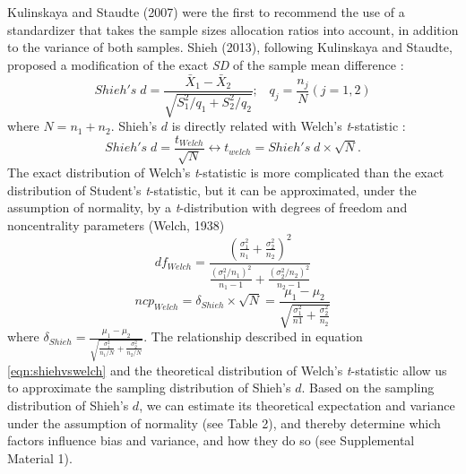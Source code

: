 \documentclass[
  english,
  man,floatsintext]{apa6}
\begin{document}
Kulinskaya and Staudte (2007) were the first to recommend the use of a standardizer that takes the sample sizes allocation ratios into account, in addition to the variance of both samples. Shieh (2013), following Kulinskaya and Staudte, proposed a modification of the exact \emph{SD} of the sample mean difference :
\begin{equation*} 
Shieh's \; d = \frac{\bar{X}_1 - \bar{X}_2}{\sqrt{S_1^2/q_1+S_2^2/q_2}}; \;\;\; q_j=\frac{n_j}{N} (j=1,2)
\label{eqn:Shiehds}
\end{equation*}
where \(N = n_1+n_2\). Shieh's \(d\) is directly related with Welch's \emph{t}-statistic :
\begin{equation} 
Shieh's \; d=\frac{t_{Welch}}{\sqrt{N}}\leftrightarrow t_{welch} = Shieh's \; d \times \sqrt{N}.
\label{eqn:shiehvswelch}
\end{equation}
The exact distribution of Welch's \emph{t}-statistic is more complicated than the exact distribution of Student's \emph{t}-statistic, but it can be approximated, under the assumption of normality, by a \emph{t}-distribution with degrees of freedom and noncentrality parameters (Welch, 1938)
\begin{equation} 
df_{Welch} = \frac{\left(\frac{\sigma^2_1}{n_1}+\frac{\sigma^2_2}{n_2} \right)^2}{\frac{(\sigma^2_1/n_1)^2}{n_1-1}+\frac{(\sigma^2_2/n_2)^2}{n_2-1}}
\label{eqn:welchdf}
\end{equation}
\begin{equation*} 
ncp_{Welch} = \delta_{Shieh} \times \sqrt{N} = \frac{\mu_1-\mu_2}{\sqrt{\frac{\sigma_1^2}{n1}+\frac{\sigma_2^2}{n_2}}}
\label{eqn:welchncp}
\end{equation*}
where \(\delta_{Shieh}=\frac{\mu_1-\mu_2}{\sqrt{\frac{\sigma_1^2}{n_1/N}+\frac{\sigma_2^2}{n_2/N}}}\). The relationship described in equation \ref{eqn:shiehvswelch} and the theoretical distribution of Welch's \emph{t}-statistic allow us to approximate the sampling distribution of Shieh's \(d\). Based on the sampling distribution of Shieh's \(d\), we can estimate its theoretical expectation and variance under the assumption of normality (see Table 2), and thereby determine which factors influence bias and variance, and how they do so (see Supplemental Material 1).
\end{document}
